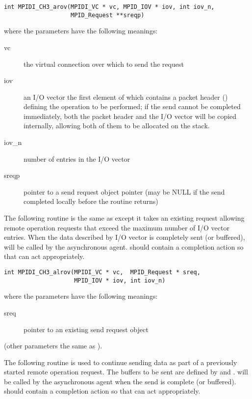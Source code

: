 \documentclass{article}
\begin{document}
\begin{verbatim}
int MPIDI_CH3_arov(MPIDI_VC * vc, MPID_IOV * iov, int iov_n,
                   MPID_Request **sreqp)
\end{verbatim}
where the parameters have the following meanings:
\begin{description}
\item[vc]the virtual connection over which to send the request

\item[iov]an I/O vector the first element of which contains a packet header
() defining the operation to be performed; if
  the send cannot 
be completed immediately, both the packet header and the I/O vector will be
copied internally, allowing both of them to be allocated on the stack.

\item[iov\_n]number of entries in the I/O vector

\item[sreqp]pointer to a send request object pointer (may be NULL if the send
completed locally before the routine returns)
\end{description}

The following routine is the same as  except it takes an
existing request allowing remote operation requests that exceed the maximum
number of I/O vector entries.  When the data described by I/O vector is
completely sent (or buffered), 
will be called 
by the asynchronous agent.   should contain a
completion action 
so that  can act appropriately.

\begin{verbatim}
int MPIDI_CH3_alrov(MPIDI_VC * vc,  MPID_Request * sreq,
                    MPID_IOV * iov, int iov_n)
\end{verbatim}
where the parameters have the following meanings:
\begin{description}
\item[sreq]pointer to an existing send request object
\end{description}
(other parameters the same as ).

The following routine is used to continue sending data as part of a
previously started remote operation request.  The buffers to be sent are
defined by  and .
 will be called by the
asynchronous agent when 
the send is complete (or buffered).   should contain a
completion action so that  can act
appropriately.
\end{document}
